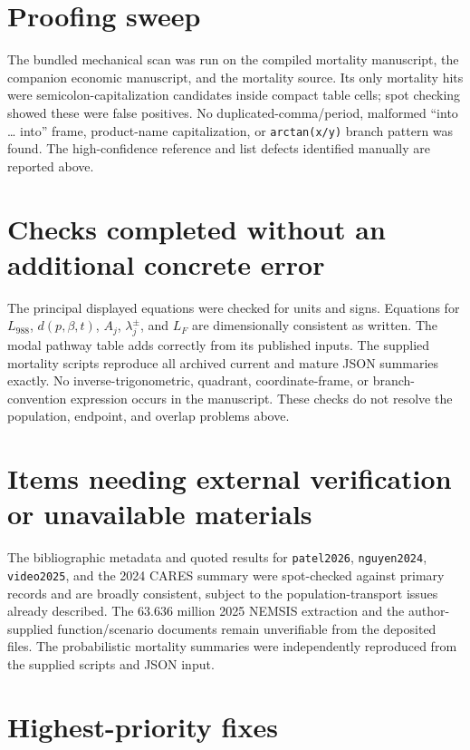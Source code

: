 \documentclass[11pt]{article}
\begin{document}
\section*{Proofing sweep}

The bundled mechanical scan was run on the compiled mortality manuscript, the
companion economic manuscript, and the mortality source.  Its only mortality
hits were semicolon-capitalization candidates inside compact table cells; spot
checking showed these were false positives.  No duplicated-comma/period,
malformed ``into \ldots{} into'' frame, product-name capitalization, or
\texttt{arctan(x/y)} branch pattern was found.  The high-confidence reference
and list defects identified manually are reported above.

\section*{Checks completed without an additional concrete error}

The principal displayed equations were checked for units and signs.  Equations
for $L_{988}$, $d(p,\beta,t)$, $A_j$, $\lambda_j^{\pm}$, and $L_F$ are
dimensionally consistent as written.  The modal pathway table adds correctly
from its published inputs.  The supplied mortality scripts reproduce all
archived current and mature JSON summaries exactly.  No inverse-trigonometric,
quadrant, coordinate-frame, or branch-convention expression occurs in the
manuscript.  These checks do not resolve the population, endpoint, and overlap
problems above.

\section*{Items needing external verification or unavailable materials}

The bibliographic metadata and quoted results for \texttt{patel2026},
\texttt{nguyen2024}, \texttt{video2025}, and the 2024 CARES summary were
spot-checked against primary records and are broadly consistent, subject to the
population-transport issues already described.  The $63.636$ million 2025
NEMSIS extraction and the author-supplied function/scenario documents remain
unverifiable from the deposited files.  The probabilistic mortality summaries
were independently reproduced from the supplied scripts and JSON input.

\section*{Highest-priority fixes}
\end{document}
